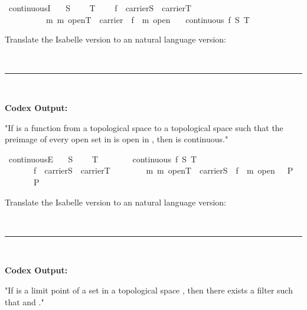\documentclass{article}
\begin{document}
\begin{boxB}
\begin{isabelle}
\isamarkupfalse \ continuousI{\isacharcolon}{\kern0pt}\isanewline
\ \ \ S\ {\isacharparenleft}{\kern0pt}\isanewline
\ \ \ T\ {\isacharparenleft}{\kern0pt}\isanewline
\ \ \ {\isachardoublequoteopen}f\ {\isacharcolon}{\kern0pt}\ carrier\isactrlbsub S\isactrlesub \ {\isasymrightarrow}\ carrier\isactrlbsub T\isactrlesub {\isachardoublequoteclose}\isanewline
\ \ \ \ \ \ \ \ \ \ {\isachardoublequoteopen}{\isasymAnd}m{\isachardot}{\kern0pt}\ m\ open\isactrlbsub T\isactrlesub \ {\isasymLongrightarrow}\ carrier\ {\isasyminter}\ {\isacharparenleft}{\kern0pt}f\ {\isacharminus}{\kern0pt}{\isacharbackquote}{\kern0pt}\ m{\isacharparenright}{\kern0pt}\ open{\isachardoublequoteclose}\isanewline
\ \ \ {\isachardoublequoteopen}continuous\ f\ S\ T{\isachardoublequoteclose}
\end{isabelle}
Translate the Isabelle version to an natural language version:

\
\hrule
\

\textbf{Codex Output:}

"If  is a function from a topological space  to a topological space  such that the preimage of every open set in  is open in , then  is continuous."
\end{boxB}

\begin{boxB}
\begin{isabelle}
\isamarkupfalse \ continuousE{\isacharcolon}{\kern0pt}\isanewline
\ \ \ S\ {\isacharparenleft}{\kern0pt}\isanewline
\ \ \isakeyword{fixes}\ T\ {\isacharparenleft}{\kern0pt}\isakeyword{structure}{\isacharparenright}{\kern0pt}\isanewline
\ \ \isakeyword{shows}\isanewline
\ \ \ \ {\isachardoublequoteopen}{\isasymlbrakk}continuous\ f\ S\ T{\isacharsemicolon}{\kern0pt}\isanewline
\ \ \ \ \ \ \ {\isasymlbrakk}f\ {\isacharcolon}{\kern0pt}\ carrier\isactrlbsub S\isactrlesub \ {\isasymrightarrow}\ carrier\isactrlbsub T\isactrlesub {\isacharsemicolon}{\kern0pt}\isanewline
\ \ \ \ \ \ \ \ {\isasymforall}m{\isachardot}{\kern0pt}\ m\ open\isactrlbsub T\isactrlesub \ {\isasymlongrightarrow}\ carrier\isactrlbsub S\isactrlesub \ {\isasyminter}\ {\isacharparenleft}{\kern0pt}f\ {\isacharminus}{\kern0pt}{\isacharbackquote}{\kern0pt}\ m{\isacharparenright}{\kern0pt}\ open\ {\isasymrbrakk}\ {\isasymLongrightarrow}\ P\isanewline
\ \ \ \ \ {\isasymrbrakk}\ {\isasymLongrightarrow}\ P{\isachardoublequoteclose}
\end{isabelle}
Translate the Isabelle version to an natural language version:

\
\hrule
\

\textbf{Codex Output:}

"If  is a limit point of a set  in a topological space , then there exists a filter  such that  and ."
\end{boxB} 
\end{document}
